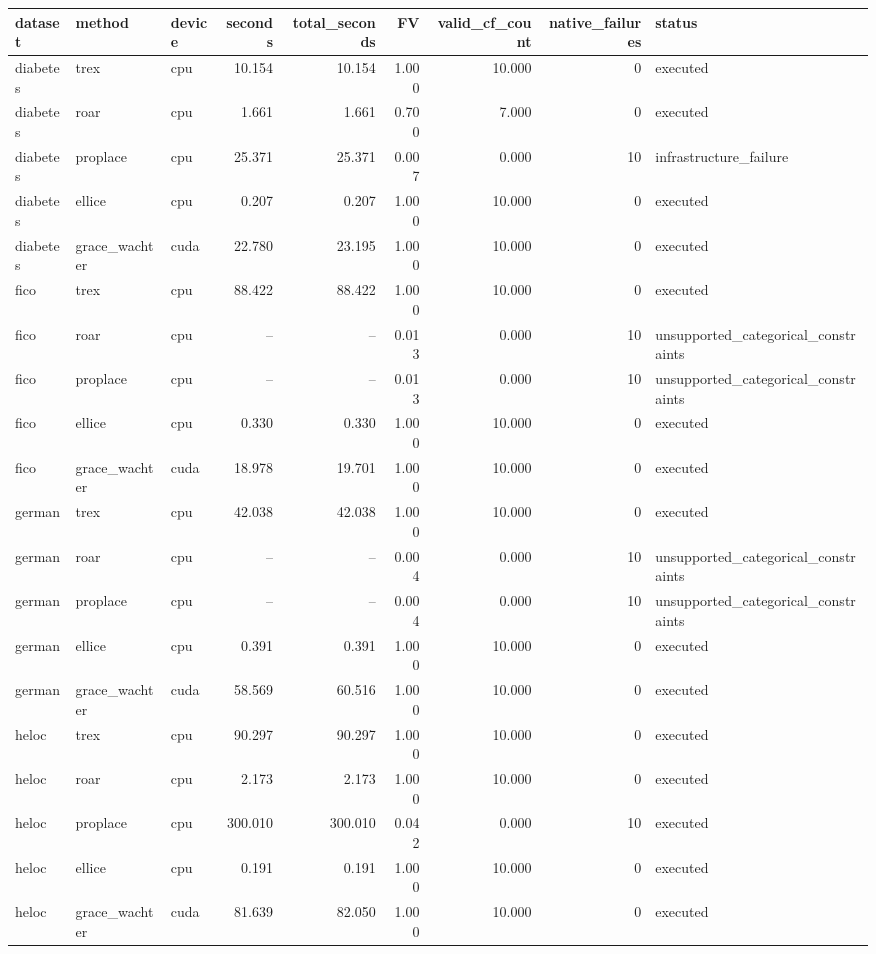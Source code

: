 \begin{tabular}{lllrrrrrl}
\toprule
dataset & method & device & seconds & total_seconds & FV & valid_cf_count & native_failures & status \\
\midrule
diabetes & trex & cpu & 10.154 & 10.154 & 1.000 & 10.000 & 0 & executed \\
diabetes & roar & cpu & 1.661 & 1.661 & 0.700 & 7.000 & 0 & executed \\
diabetes & proplace & cpu & 25.371 & 25.371 & 0.007 & 0.000 & 10 & infrastructure_failure \\
diabetes & ellice & cpu & 0.207 & 0.207 & 1.000 & 10.000 & 0 & executed \\
diabetes & grace_wachter & cuda & 22.780 & 23.195 & 1.000 & 10.000 & 0 & executed \\
fico & trex & cpu & 88.422 & 88.422 & 1.000 & 10.000 & 0 & executed \\
fico & roar & cpu & -- & -- & 0.013 & 0.000 & 10 & unsupported_categorical_constraints \\
fico & proplace & cpu & -- & -- & 0.013 & 0.000 & 10 & unsupported_categorical_constraints \\
fico & ellice & cpu & 0.330 & 0.330 & 1.000 & 10.000 & 0 & executed \\
fico & grace_wachter & cuda & 18.978 & 19.701 & 1.000 & 10.000 & 0 & executed \\
german & trex & cpu & 42.038 & 42.038 & 1.000 & 10.000 & 0 & executed \\
german & roar & cpu & -- & -- & 0.004 & 0.000 & 10 & unsupported_categorical_constraints \\
german & proplace & cpu & -- & -- & 0.004 & 0.000 & 10 & unsupported_categorical_constraints \\
german & ellice & cpu & 0.391 & 0.391 & 1.000 & 10.000 & 0 & executed \\
german & grace_wachter & cuda & 58.569 & 60.516 & 1.000 & 10.000 & 0 & executed \\
heloc & trex & cpu & 90.297 & 90.297 & 1.000 & 10.000 & 0 & executed \\
heloc & roar & cpu & 2.173 & 2.173 & 1.000 & 10.000 & 0 & executed \\
heloc & proplace & cpu & 300.010 & 300.010 & 0.042 & 0.000 & 10 & executed \\
heloc & ellice & cpu & 0.191 & 0.191 & 1.000 & 10.000 & 0 & executed \\
heloc & grace_wachter & cuda & 81.639 & 82.050 & 1.000 & 10.000 & 0 & executed \\
\bottomrule
\end{tabular}
